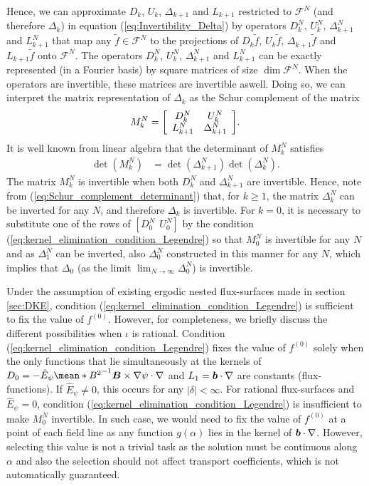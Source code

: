  
 Hence, we can approximate $D_k$, $U_k$, $\Delta_{k+1}$ and $L_{k+1} $ restricted to $\mathcal{F}^{N}$ (and therefore $\Delta_{k}$) in equation (\ref{eq:Invertibility_Delta}) by operators $D_k^N$, $U_k^N$, $\Delta_{k+1}^N$ and $L_{k+1}^N$ that map any $\tilde{f}\in\mathcal{F}^N$ to the projections of $D_k \tilde{f}$, $U_k \tilde{f}$, $\Delta_{k+1} \tilde{f}$ and $L_{k+1} \tilde{f}$ onto $\mathcal{F}^N$. The operators $D_k^N$, $U_k^N$, $\Delta_{k+1}^N$ and $L_{k+1}^N$ can be exactly represented (in a Fourier basis) by square matrices of size $\dim \mathcal{F}^N$. When the operators are invertible, these matrices are invertible aswell. Doing so, we can interpret the matrix representation of $\Delta_{k}$ as the Schur complement of the matrix
%
\begin{align}
	M_k^N = 
	\Matrix{cc}
	{ D_k^N & U_k^N \\
		L_{k+1}^N & \Delta_{k+1}^N
	}.
	\label{eq:Invertibility_Delta_Schur}
\end{align}
It is well known from linear algebra that the determinant of $M_k^N$ satisfies
%
\begin{align}
	\det(M_k^N)
	& =
	\det(\Delta_{k+1}^N)
	\det(\Delta_k^N)
	.
	\label{eq:Schur_complement_determinant}
\end{align}
%
The matrix $M_k^N$ is invertible when both $D_k^N$ and $\Delta_{k+1}^N$ are invertible. Hence, note from (\ref{eq:Schur_complement_determinant}) that, for $k\ge1$, the matrix $\Delta_{k}^N$ can be inverted for any $N$, and therefore $\Delta_{k}$ is invertible. For $k=0$, it is necessary to substitute one of the rows of $[D_0^N \ \ U_0^N]$ by the condition (\ref{eq:kernel_elimination_condition_Legendre}) so that $M_0^N$ is invertible for any $N$ and as $\Delta_1^N$ can be inverted, also $\Delta_0^N$ constructed in this manner for any $N$, which implies that $\Delta_0$ (as the limit $\lim_{N\rightarrow\infty} \Delta_0^N$) is invertible. 

Under the assumption of existing ergodic nested flux-surfaces made in section \ref{sec:DKE}, condition (\ref{eq:kernel_elimination_condition_Legendre}) is sufficient to fix the value of $f^{(0)}$. However, for completeness, we briefly discuss the different possibilities when $\iota$ is rational. Condition (\ref{eq:kernel_elimination_condition_Legendre}) fixes the value of $f^{(0)}$ solely when the only functions that lie simultaneously at the kernels of $D_0 = -\hat{E}_\psi \mean*{B^2}^{-1} \vb*{B}\times\nabla\psi\cdot\nabla$ and $L_1=\vb*{b}\cdot\nabla$ are constants (flux-functions). If $\hat{E}_\psi \ne 0$, this occurs for any $|\delta|<\infty $. For rational flux-surfaces and $\hat{E}_\psi = 0$, condition (\ref{eq:kernel_elimination_condition_Legendre}) is insufficient to make $M_0^N$ invertible. In such case, we would need to fix the value of $f^{(0)}$ at a point of each field line as any function $g(\alpha)$ lies in the kernel of $\vb*{b}\cdot\nabla$. However, selecting this value is not a trivial task as the solution must be continuous along $\alpha$ and also the selection should not affect transport coefficients, which is not automatically guaranteed. 